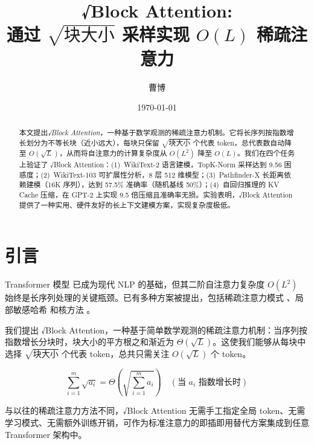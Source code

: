 \documentclass[11pt,a4paper,fontset=mac]{ctexart}
\title{\textbf{√Block Attention: \\ 通过 $\sqrt{\text{块大小}}$ 采样实现 $O(L)$ 稀疏注意力}}
\author{曹博}
\date{\today}
\begin{document}
\maketitle

\begin{abstract}
本文提出\textit{√Block Attention}，一种基于数学观测的稀疏注意力机制。它将长序列按指数增长划分为不等长块（近小远大），每块只保留 $\sqrt{\text{块大小}}$ 个代表 token，总代表数自动降至 $O(\sqrt{L})$，从而将自注意力的计算复杂度从 $O(L^2)$ 降至 $O(L)$。我们在四个任务上验证了 √Block Attention：(1)~WikiText-2 语言建模，TopK-Norm 采样达到 9.56 困惑度；(2)~WikiText-103 可扩展性分析，8 层 512 维模型；(3)~Pathfinder-X 长距离依赖建模（16K 序列），达到 57.5\% 准确率（随机基线 50\%）；(4)~自回归推理的 KV Cache 压缩，在 GPT-2 上实现 9.5 倍压缩且准确率无损。实验表明，√Block Attention 提供了一种实用、硬件友好的长上下文建模方案，实现复杂度极低。
\end{abstract}

\section{引言}
\label{sec:introduction}

Transformer 模型 \cite{vaswani2017attention} 已成为现代 NLP 的基础，但其二阶自注意力复杂度 $O(L^2)$ 始终是长序列处理的关键瓶颈。已有多种方案被提出，包括稀疏注意力模式 \cite{child2019generating, beltagy2020longformer, kitaev2020reformer}、局部敏感哈希 \cite{kitaev2020reformer} 和核方法 \cite{choromanski2020rethinking}。

我们提出 √Block Attention，一种基于简单数学观测的稀疏注意力机制：当序列按指数增长分块时，块大小的平方根之和渐近为 $\Theta(\sqrt{L})$。这使我们能够从每块中选择 $\sqrt{\text{块大小}}$ 个代表 token，总共只需关注 $O(\sqrt{L})$ 个 token。

\begin{equation}
\sum_{i=1}^{m} \sqrt{a_i} = \Theta\left(\sqrt{\sum_{i=1}^{m} a_i}\right) \quad (\text{当 } a_i \text{ 指数增长时})
\label{eq:core}
\end{equation}

与以往的稀疏注意力方法不同，√Block Attention 无需手工指定全局 token、无需学习模式、无需额外训练开销，可作为标准注意力的即插即用替代方案集成到任意 Transformer 架构中。

\end{document}
